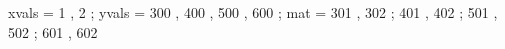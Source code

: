 \begin{functable}
    xvals = 1  , 2 ;
    yvals = 300 , 400 , 500 , 600 ;
    mat   = 301 , 302 ;
            401 , 402 ;
            501 , 502 ;
            601 , 602 
\end{functable}
